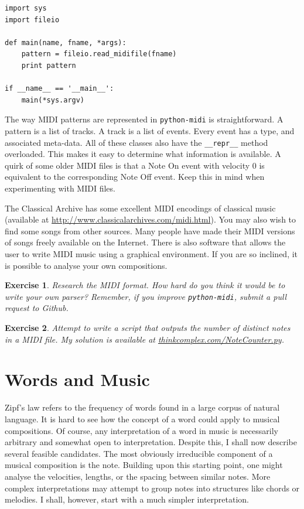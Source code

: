 \documentclass[10pt]{book}
\newtheorem{exercise}{Exercise}[chapter]
\begin{document}
\begin{verbatim}
import sys
import fileio

def main(name, fname, *args):
    pattern = fileio.read_midifile(fname)
    print pattern

if __name__ == '__main__':
    main(*sys.argv)

\end{verbatim}


The way MIDI patterns are represented in \texttt{python-midi} is straightforward. A pattern is a list of tracks. A track is a list of events. Every event has a type, and associated meta-data. All of these classes also have the \texttt{\_\_repr\_\_} method overloaded. This makes it easy to determine what information is available. A quirk of some older MIDI files is that a Note On event with velocity 0 is equivalent to the corresponding Note Off event. Keep this in mind when experimenting with MIDI files.

The Classical Archive has some excellent MIDI encodings of classical music (available at \url{http://www.classicalarchives.com/midi.html}). You may also wish to find some songs from other sources. Many people have made their MIDI versions of songs freely available on the Internet. There is also software that allows the user to write MIDI music using a graphical environment. If you are so inclined, it is possible to analyse your own compositions.


\begin{exercise}
Research the MIDI format. How hard do you think it would be to write your own parser? Remember, if you improve \texttt{python-midi}, submit a pull request to Github.
\end{exercise}

\begin{exercise}
Attempt to write a script that outputs the number of distinct notes in a MIDI file. My solution is available at \url{thinkcomplex.com/NoteCounter.py}.
\end{exercise}


\section{Words and Music}

Zipf's law refers to the frequency of words found in a large corpus of natural language. It is hard to see how the concept of a word could apply to musical compositions. Of course, any interpretation of a word in music is necessarily arbitrary and somewhat open to interpretation. Despite this, I shall now describe several feasible candidates. The most obviously irreducible component of a musical composition is the note. Building upon this starting point, one might analyse the velocities, lengths, or the spacing between similar notes. More complex interpretations may attempt to group notes into structures like chords or melodies. I shall, however, start with a much simpler interpretation.
\end{document}
